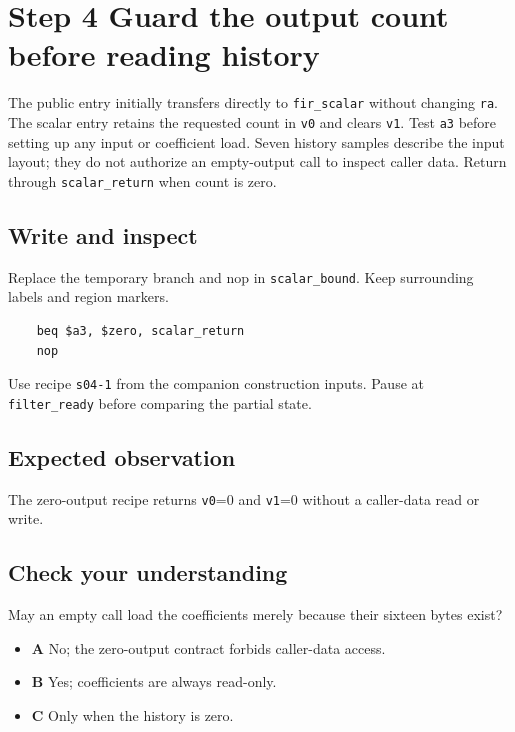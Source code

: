\section{Step 4 Guard the output count before reading history}\label{fir-s04}

The public entry initially transfers directly to \texttt{fir\_scalar} without changing \texttt{ra}. The scalar entry retains the requested count in \texttt{v0} and clears \texttt{v1}. Test \texttt{a3} before setting up any input or coefficient load. Seven history samples describe the input layout; they do not authorize an empty-output call to inspect caller data. Return through \texttt{scalar\_return} when count is zero.

\subsection{Write and inspect}
Replace the temporary branch and nop in \texttt{scalar\_bound}. Keep surrounding labels and region markers.

\begin{verbatim}
    beq $a3, $zero, scalar_return
    nop
\end{verbatim}
Use recipe \texttt{s04-1} from the companion construction inputs. Pause at \texttt{filter\_ready} before comparing the partial state.

\subsection{Expected observation}
The zero-output recipe returns \texttt{v0}=0 and \texttt{v1}=0 without a caller-data read or write.

\subsection{Check your understanding}
May an empty call load the coefficients merely because their sixteen bytes exist?

\begin{itemize}
\item \textbf{A} No; the zero-output contract forbids caller-data access.
\item \textbf{B} Yes; coefficients are always read-only.
\item \textbf{C} Only when the history is zero.
\end{itemize}

